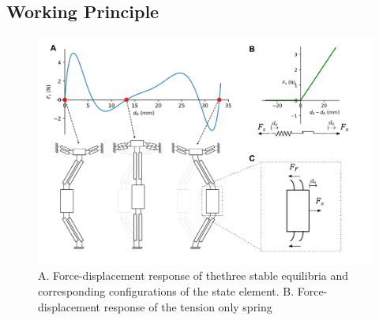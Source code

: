 \subsection*{Working Principle}
\begin{figure}[h]
    \centering
    \includegraphics[width=\textwidth]{images/SVGs/Equilibria1.pdf}
    \caption{A. Force-displacement response of thethree stable equilibria and corresponding configurations of the state element. B. Force-displacement response of the tension only spring }
    \label{fig:Equilibria and Tension-only spring}

\end{figure}


